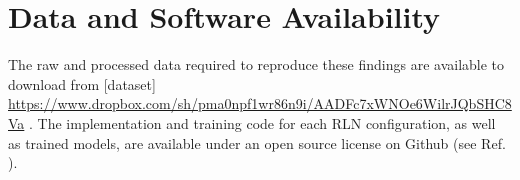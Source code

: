 \documentclass[3p, preprint]{elsarticle}
\newenvironment{revision} {} {}
\begin{document}
\section{Data and Software Availability}
The raw and processed data required to reproduce these findings are available to download from [dataset] \url{https://www.dropbox.com/sh/pma0npf1wr86n9i/AADFc7xWNOe6WilrJQbSHC8Va} \cite{dropbox_data}. \begin{revision} The implementation and training code for each RLN configuration, as well as trained models,\end{revision} are available under an open source license on Github (see Ref. \cite{github_code}).

\clearpage 


\end{document}
